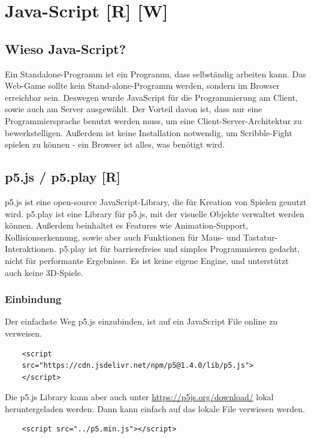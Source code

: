 
\section{Java-Script [R] [W]}
\subsection{Wieso Java-Script?}
Ein Standalone-Programm ist ein Programm, dass selbständig arbeiten kann.
Das Web-Game sollte kein Stand-alone-Programm werden, sondern im Browser erreichbar sein. Deswegen wurde JavaScript für die Programmierung am Client, sowie auch am Server ausgewählt.
Der Vorteil davon ist, dass nur eine Programmiersprache benutzt werden muss, um eine Client-Server-Architektur zu bewerkstelligen.
Außerdem ist keine Installation notwendig, um Scribble-Fight spielen zu können - ein Browser ist alles, was benötigt wird.
\subsection{p5.js / p5.play [R]}
\label{subsection:p5js}
p5.js ist eine open-source JavaScript-Library, die für Kreation von Spielen genutzt wird.
p5.play ist eine Library für p5.js, mit der visuelle Objekte verwaltet werden können. Außerdem beinhaltet es Features wie Animation-Support,
Kollisionserkennung, sowie aber auch Funktionen für Maus- und Tastatur-Interaktionen.
p5.play ist für barrierefreies und simples Programmieren gedacht, nicht für performante Ergebnisse.
Es ist keine eigene Engine, und unterstützt auch keine 3D-Spiele. \cite{p5js} \cite{p5play}

\subsubsection{Einbindung}
Der einfachste Weg p5.js einzubinden, ist auf ein JavaScript File online zu verweisen.

\begin{lstlisting}
    <script 
    src="https://cdn.jsdelivr.net/npm/p5@1.4.0/lib/p5.js">
    </script>
\end{lstlisting}
Die p5.js Library kann aber auch
unter \url{https://p5js.org/download/} lokal heruntergeladen werden.
Dann kann einfach auf das lokale File verwiesen werden.

\begin{lstlisting}
    <script src="../p5.min.js"></script>
\end{lstlisting}

